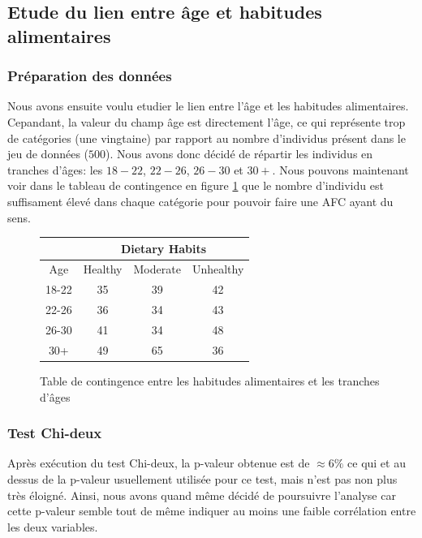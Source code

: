\subsection{Etude du lien entre âge et habitudes alimentaires}

\subsubsection{Préparation des données}

Nous avons ensuite voulu etudier le lien entre l'âge et les habitudes alimentaires.
Cepandant, la valeur du champ âge est directement l'âge, ce qui représente trop de catégories (une vingtaine) par rapport au nombre d'individus présent dans le jeu de données ($500$).
Nous avons donc décidé de répartir les individus en tranches d'âges: les $18-22$, $22-26$, $26-30$ et $30+$.
Nous pouvons maintenant voir dans le tableau de contingence en figure \ref{tab:contTableAgeDietary} que le nombre d'individu est suffisament élevé dans chaque catégorie pour pouvoir faire une AFC ayant du sens.

\begin{figure}[!h]
\begin{center}
  \begin{tabular}{|c|c|c|c|}
    \hline 
    & \multicolumn{3}{|c|}{Dietary Habits}\\ 
    \hline
    Age & Healthy & Moderate & Unhealthy \\ 
    \hline 
    18-22 & 35 & 39 & 42 \\ 
    \hline 
    22-26 & 36 & 34 & 43 \\ 
    \hline 
    26-30 & 41 & 34 & 48 \\ 
    \hline 
    30+ & 49 & 65 & 36 \\ 
    \hline
  \end{tabular}
\end{center}
\caption{Table de contingence entre les habitudes alimentaires et les tranches d'âges}
\label{tab:contTableAgeDietary}
\end{figure}

\subsubsection{Test Chi-deux}

Après exécution du test Chi-deux, la p-valeur obtenue est de $\approx6\%$ ce qui et au dessus de la p-valeur usuellement utilisée pour ce test, mais n'est pas non plus très éloigné.
Ainsi, nous avons quand même décidé de poursuivre l'analyse car cette p-valeur semble tout de même indiquer au moins une faible corrélation entre les deux variables.

